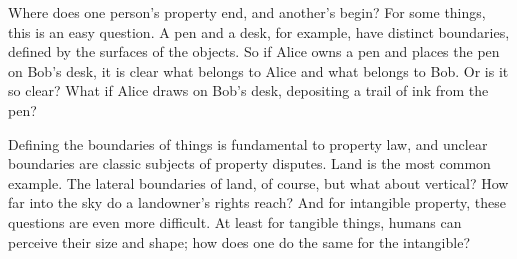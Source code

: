 Where does one person's property end, and another's begin? For some things, this
is an easy question. A pen and a desk, for example, have distinct boundaries,
defined by the surfaces of the objects. So if Alice owns a pen and places the
pen on Bob's desk, it is clear what belongs to Alice and what belongs to Bob. Or
is it so clear? What if Alice draws on Bob's desk, depositing a trail of ink
from the pen?

Defining the boundaries of things is fundamental to property law, and unclear
boundaries are classic subjects of property disputes. Land is the most common
example. The lateral boundaries of land, of course, but what about vertical? How
far into the sky do a landowner's rights reach? And for intangible property,
these questions are even more difficult. At least for tangible things, humans
can perceive their size and shape; how does one do the same for the intangible?
